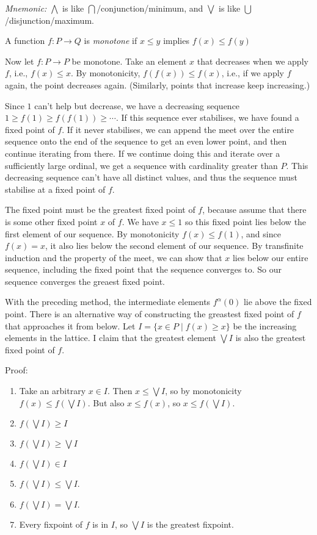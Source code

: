 \emph{Mnemonic:} $\bigwedge$ is like $\bigcap$/conjunction/minimum, and $\bigvee$ is like $\bigcup$/disjunction/maximum.

\begin{definition}
  A function $f : P \to Q$ is \emph{monotone} if $x \leq y$ implies $f(x) \leq f(y)$
\end{definition}

Now let $f : P \to P$ be monotone.
Take an element $x$ that decreases when we apply $f$, i.e., $f(x) \leq x$.
By monotonicity, $f(f(x)) \leq f(x)$, i.e., if we apply $f$ again, the point decreases again.
(Similarly, points that increase keep increasing.)

Since $1$ can't help but decrease, we have a decreasing sequence $1 \geq f(1) \geq f(f(1)) \geq \cdots$.
If this sequence ever stabilises, we have found a fixed point of $f$.
If it never stabilises, we can append the meet over the entire sequence onto the end of the sequence to get an even lower point,
and then continue iterating from there.
If we continue doing this and iterate over a sufficiently large ordinal,
we get a sequence with cardinality greater than $P$.
This decreasing sequence can't have all distinct values,
and thus the sequence must stabilise at a fixed point of $f$.

The fixed point must be the greatest fixed point of $f$,
because assume that there is some other fixed point $x$ of $f$.
We have $x \leq 1$ so this fixed point lies below the first element of our sequence.
By monotonicity $f(x) \leq f(1)$, and since $f(x) = x$, it also lies below the second element of our sequence.
By transfinite induction and the property of the meet, we can show that $x$ lies below our entire sequence, including the fixed point that the sequence converges to.
So our sequence converges the greaest fixed point.

With the preceding method, the intermediate elements $f^\alpha(0)$ lie above the fixed point.
There is an alternative way of constructing the greastest fixed point of $f$ that approaches it from below.
Let $I = \{ x \in P \mid f(x) \geq x \}$ be the increasing elements in the lattice.
I claim that the greatest element $\bigvee I$ is also the greatest fixed point of $f$.

Proof:
\begin{enumerate}
  \item Take an arbitrary $x \in I$. Then $x \leq \bigvee I$, so by monotonicity $f(x) \leq f(\bigvee I)$.
        But also $x \leq f(x)$, so $x \leq f(\bigvee I)$.
  \item $f(\bigvee I) \geq I$
  \item $f(\bigvee I) \geq \bigvee I$
  \item $f(\bigvee I) \in I$
  \item $f(\bigvee I) \leq \bigvee I$.
  \item $f(\bigvee I) = \bigvee I$.
  \item Every fixpoint of $f$ is in $I$, so $\bigvee I$ is the greatest fixpoint.
\end{enumerate}





